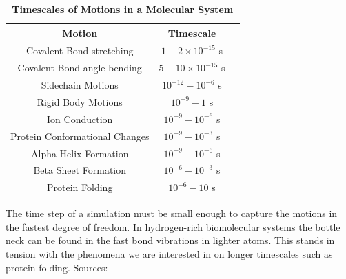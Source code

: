 \begin{table}
	\begin{center}   
		\begin{tabular}{ |c|c|c|}
			\hline
			Motion & Timescale \\
			\hline
			Covalent Bond-stretching & $1-2\times10^{-15}$ s \\
			Covalent Bond-angle bending & $5-10\times10^{-15}$ s \\ 
			Sidechain  Motions & $10 ^{-12}-10^{-6}$ s \\
			Rigid Body Motions & $10 ^{-9}-1$ s \\
			Ion Conduction & $10^{-9}-10^{-6}$ s \\
			Protein Conformational Changes & $10^{-9}-10^{-3}$ s \\
			Alpha Helix Formation & $10^{-9}-10^{-6}$ s \\
			Beta Sheet Formation & $10^{-6}-10^{-3}$ s \\
			Protein Folding & $10^{-6}-10$ s \\
			\hline
		\end{tabular}
\end{center}
	\captionsetup{singlelinecheck = false, justification=raggedright}
	\caption[Timescales of Motions in a Molecular System]{\textbf{Timescales of Motions in a Molecular System}} {The time step of a simulation must be small enough to capture the motions in the fastest degree of freedom. In hydrogen-rich biomolecular systems the bottle neck can be found in the fast bond vibrations in lighter atoms. This stands in tension with the phenomena we are interested in on longer timescales such as protein folding. Sources: \cite{leach2001}\cite{schlick2010}\cite{brooks1988}\cite{flood2019}\cite{werner2012}} \cite{feenstra1999}
	\label{timescales}
\end{table}


